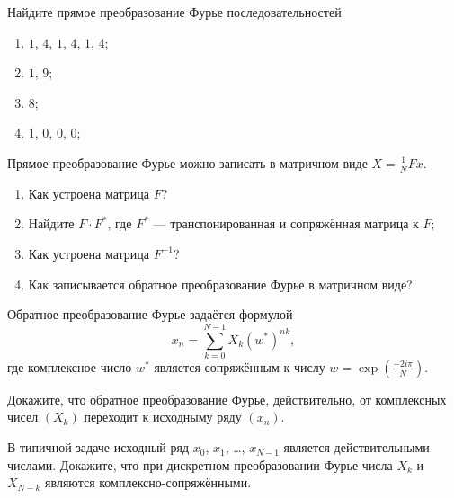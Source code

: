 \begin{problem}
Найдите прямое преобразование Фурье последовательностей
\begin{enumerate}
  \item $1$, $4$, $1$, $4$, $1$, $4$;
  \item $1$, $9$;
  \item $8$;
  \item $1$, $0$, $0$, $0$;
\end{enumerate}
  \begin{sol}
  \end{sol}
\end{problem}

\begin{problem}
  Прямое преобразование Фурье можно записать в матричном виде $X = \frac{1}{N}Fx$. 
  \begin{enumerate}
    \item Как устроена матрица $F$?
    \item Найдите $F\cdot F^{*}$, где $F^{*}$ — транспонированная и сопряжённая матрица к $F$;
    \item Как устроена матрица $F^{-1}$?
    \item Как записывается обратное преобразование Фурье в матричном виде?
  \end{enumerate}

  \begin{sol}
  \end{sol}
\end{problem}


\begin{problem}

Обратное преобразование Фурье задаётся формулой
\[
  x_n = \sum_{k=0}^{N-1} X_k (w^{*})^{nk}, 
\]
где комплексное число $w^{*}$ является сопряжённым к числу $w = \exp\left(\frac{-2i\pi}{N} \right)$.


  Докажите, что обратное преобразование Фурье, действительно, от комплексных чисел $(X_k)$ переходит к исходныму ряду $(x_n)$.
  \begin{sol}
  \end{sol}
\end{problem}


\begin{problem}
  В типичной задаче исходный ряд $x_0$, $x_1$, \ldots, $x_{N-1}$ является действительными числами. 
  Докажите, что при дискретном преобразовании Фурье числа $X_k$ и $X_{N-k}$ являются комплексно-сопряжёнными.

  \begin{sol}
  \end{sol}
\end{problem}


